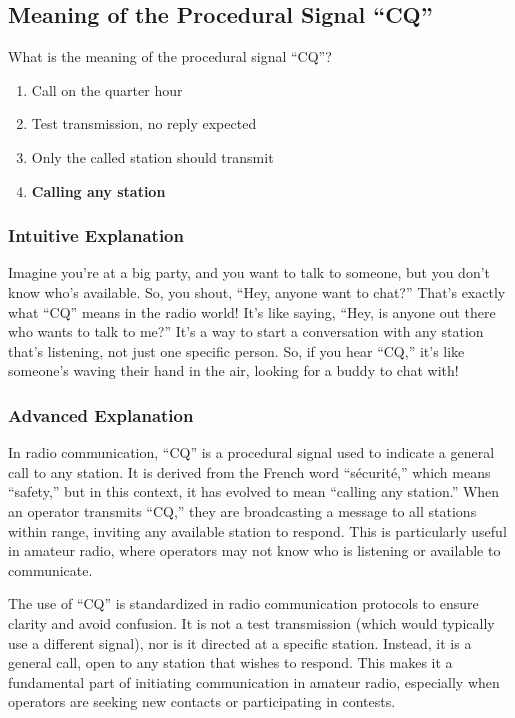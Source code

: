 \subsection{Meaning of the Procedural Signal “CQ”}
\label{T2A08}

\begin{tcolorbox}[colback=gray!10!white,colframe=black!75!black,title=T2A08]
What is the meaning of the procedural signal “CQ”?  
\begin{enumerate}[label=\Alph*)]
    \item Call on the quarter hour
    \item Test transmission, no reply expected
    \item Only the called station should transmit
    \item \textbf{Calling any station}
\end{enumerate}
\end{tcolorbox}

\subsubsection{Intuitive Explanation}
Imagine you’re at a big party, and you want to talk to someone, but you don’t know who’s available. So, you shout, “Hey, anyone want to chat?” That’s exactly what “CQ” means in the radio world! It’s like saying, “Hey, is anyone out there who wants to talk to me?” It’s a way to start a conversation with any station that’s listening, not just one specific person. So, if you hear “CQ,” it’s like someone’s waving their hand in the air, looking for a buddy to chat with!

\subsubsection{Advanced Explanation}
In radio communication, “CQ” is a procedural signal used to indicate a general call to any station. It is derived from the French word “sécurité,” which means “safety,” but in this context, it has evolved to mean “calling any station.” When an operator transmits “CQ,” they are broadcasting a message to all stations within range, inviting any available station to respond. This is particularly useful in amateur radio, where operators may not know who is listening or available to communicate.

The use of “CQ” is standardized in radio communication protocols to ensure clarity and avoid confusion. It is not a test transmission (which would typically use a different signal), nor is it directed at a specific station. Instead, it is a general call, open to any station that wishes to respond. This makes it a fundamental part of initiating communication in amateur radio, especially when operators are seeking new contacts or participating in contests.

